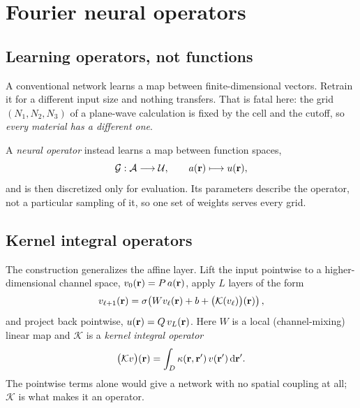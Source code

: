 \chapter{Fourier neural operators}
\label{ch:fno}

\section{Learning operators, not functions}

A conventional network learns a map between finite-dimensional vectors. Retrain
it for a different input size and nothing transfers. That is fatal here: the
grid $(N_1,N_2,N_3)$ of a plane-wave calculation is fixed by the cell and the
cutoff, so \emph{every material has a different one}.

A \emph{neural operator} instead learns a map between function spaces,
\begin{equation}
  \mathcal{G}: \mathcal{A} \longrightarrow \mathcal{U},
  \qquad
  a(\mathbf{r}) \longmapsto u(\mathbf{r}),
\end{equation}
and is then discretized only for evaluation. Its parameters describe the
operator, not a particular sampling of it, so one set of weights serves every
grid.

\section{Kernel integral operators}

The construction generalizes the affine layer. Lift the input pointwise to a
higher-dimensional channel space, $v_0(\mathbf{r}) = P\,a(\mathbf{r})$, apply $L$ layers of
the form
\begin{equation}
  v_{\ell+1}(\mathbf{r}) = \sigma\!\left(
      W v_{\ell}(\mathbf{r}) + b
      + \bigl(\mathcal{K}(v_\ell)\bigr)(\mathbf{r}) \right),
  \label{eq:noperator}
\end{equation}
and project back pointwise, $u(\mathbf{r}) = Q\,v_L(\mathbf{r})$. Here $W$ is a local
(channel-mixing) linear map and $\mathcal{K}$ is a \emph{kernel integral
operator}
\begin{equation}
  \bigl(\mathcal{K}v\bigr)(\mathbf{r}) = \int_D \kappa(\mathbf{r},\mathbf{r}')\,v(\mathbf{r}')\,\mathrm{d}\mathbf{r}' .
\end{equation}
The pointwise terms alone would give a network with no spatial coupling at all;
$\mathcal{K}$ is what makes it an operator.

